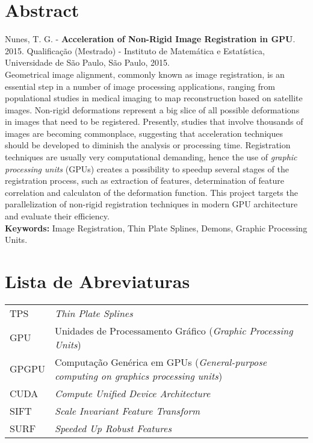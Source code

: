 \documentclass[11pt,twoside,a4paper]{book}
\begin{document}
\chapter*{Abstract}
\noindent Nunes, T. G. - \textbf{Acceleration of Non-Rigid Image Registration in GPU}. 
2015.
Qualificação (Mestrado) - Instituto de Matemática e Estatística,
Universidade de São Paulo, São Paulo, 2015.
\\
Geometrical image alignment, commonly known as image registration, is an essential step in a number of image processing applications, 
ranging from populational studies in medical imaging to map reconstruction based on satellite images. Non-rigid deformations
represent a big slice of all possible deformations in images that need to be registered. 
Presently, studies that involve thousands of images are becoming commonplace, 
suggesting that acceleration techniques should be developed to diminish the analysis or processing time. 
Registration techniques are usually very computational demanding, hence the use of \textit{graphic processing units} (GPUs) 
creates a possibility to speedup several stages of the registration process, such as extraction of features, 
determination of feature correlation and calculaton of the deformation function. This project targets the
parallelization of non-rigid registration techniques in modern GPU architecture and evaluate their 
efficiency. 
\\

\noindent \textbf{Keywords:} Image Registration, Thin Plate Splines, Demons, Graphic Processing Units.

\tableofcontents    %

\chapter{Lista de Abreviaturas}
\begin{tabular}{ll}
        TPS         & \textit{Thin Plate Splines}\\
        GPU         & Unidades de Processamento Gráfico (\textit{Graphic Processing Units})\\
        GPGPU       & Computação Genérica em GPUs (\textit{General-purpose computing on graphics processing units})\\
        CUDA        & \textit{Compute Unified Device Architecture}\\
        SIFT        & \textit{Scale Invariant Feature Transform} \\ 
        SURF        & \textit{Speeded Up Robust Features} \\
\end{tabular}
\end{document}
